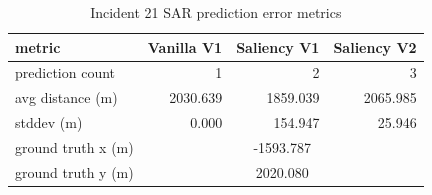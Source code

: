 \begin{table}[ht]
\centering
\caption{Incident 21 SAR prediction error metrics}
\label{tab:sar-incident-21}
\begin{tabular}{lrrr}
\hline
metric & Vanilla V1 & Saliency V1 & Saliency V2 \\
\hline
prediction count & 1 & 2 & 3 \\
avg distance (m) & 2030.639 & 1859.039 & 2065.985 \\
stddev (m) & 0.000 & 154.947 & 25.946 \\
ground truth x (m) & \multicolumn{3}{c}{-1593.787} \\
ground truth y (m) & \multicolumn{3}{c}{2020.080} \\
\hline
\end{tabular}
\end{table}

